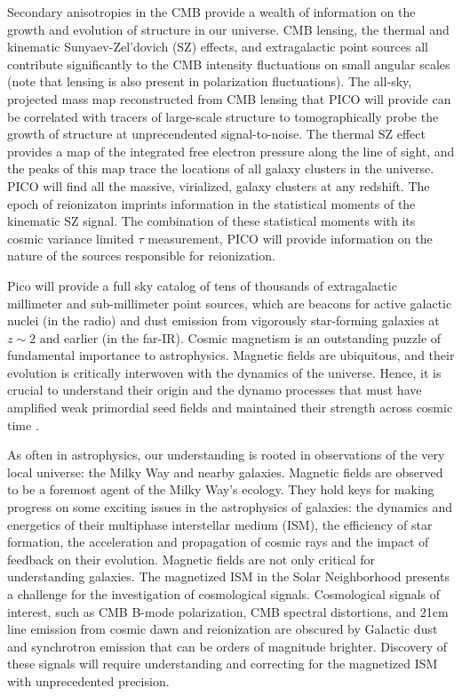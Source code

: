 \documentclass[PICOReport.tex]{subfiles}
\begin{document}
Secondary anisotropies in the CMB provide a wealth of information on the growth and evolution of structure in our universe. CMB lensing, the thermal and kinematic Sunyaev-Zel'dovich (SZ) effects, and extragalactic point sources all contribute significantly to the CMB intensity fluctuations on small angular scales (note that lensing is also present in polarization fluctuations). The all-sky, projected mass map reconstructed from CMB lensing that PICO will provide can be correlated with tracers of large-scale structure to tomographically probe the growth of structure at unprecendented signal-to-noise. The thermal SZ effect provides a map of the integrated free electron pressure along the line of sight, and the peaks of this map trace the locations of all galaxy clusters in the universe. PICO will find all the massive, virialized, galaxy clusters at any redshift.  The epoch of reionizaton imprints information in the statistical moments of the kinematic SZ signal.  The combination of these statistical moments with its cosmic variance limited $\tau$ measurement, PICO will provide information on the nature of the sources responsible for reionization.

Pico will provide a full sky catalog of tens of thousands of extragalactic millimeter and sub-millimeter point sources, which are beacons for active galactic nuclei (in the radio) and dust emission from vigorously star-forming galaxies at $z \sim 2$ and earlier (in the far-IR). Cosmic magnetism is an outstanding puzzle of fundamental importance to astrophysics. Magnetic fields are ubiquitous, and their evolution is critically interwoven with the dynamics of the universe. Hence, it is crucial to understand their origin and the dynamo processes that must have amplified weak  primordial seed fields and maintained their strength across cosmic time \citep{Brandenburg2005}. 

As often in astrophysics, our understanding is rooted in observations of the very local universe: the Milky Way and nearby galaxies. Magnetic fields are observed to be a foremost agent of the Milky Way's ecology. They hold keys for making progress on some exciting issues in the astrophysics of galaxies: the dynamics and energetics of their multiphase interstellar medium (ISM), the efficiency of star formation, the acceleration and propagation of cosmic rays and the impact of feedback on their evolution. Magnetic fields are not only critical for understanding galaxies. The magnetized ISM in the Solar Neighborhood presents a challenge for the investigation of cosmological signals. Cosmological signals of interest, such as CMB B-mode polarization, CMB spectral distortions, and 21cm line emission from cosmic dawn and reionization are obscured by Galactic dust and synchrotron emission that can be orders of magnitude brighter. Discovery of these signals will require understanding and correcting for the magnetized ISM with unprecedented precision.  
\end{document}
